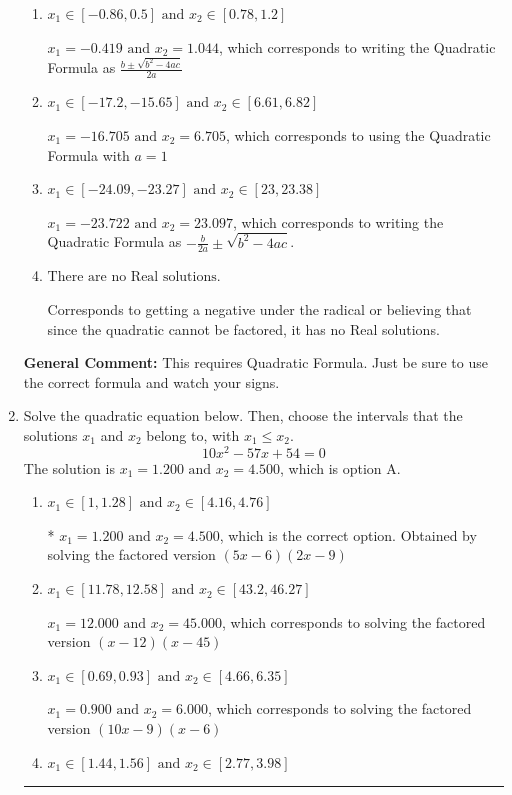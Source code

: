 \documentclass{extbook}[14pt]
\newcommand{\litem}[1]{\item #1

\rule{\textwidth}{0.4pt}}
\begin{document}
\begin{enumerate}
{\begin{enumerate}[label=\Alph*.]
* $x_1 = -1.044 \text{ and } x_2 = 0.419$, which is the correct option.
\item \( x_1 \in [-0.86, 0.5] \text{ and } x_2 \in [0.78, 1.2] \)

 $x_1 = -0.419 \text{ and } x_2 = 1.044$, which corresponds to writing the Quadratic Formula as $\frac{b \pm \sqrt{b^2 - 4ac}}{2a}$
\item \( x_1 \in [-17.2, -15.65] \text{ and } x_2 \in [6.61, 6.82] \)

 $x_1 = -16.705 \text{ and } x_2 = 6.705$, which corresponds to using the Quadratic Formula with $a=1$
\item \( x_1 \in [-24.09, -23.27] \text{ and } x_2 \in [23, 23.38] \)

 $x_1 = -23.722 \text{ and } x_2 = 23.097$, which corresponds to writing the Quadratic Formula as $-\frac{b}{2a} \pm \sqrt{b^2 - 4ac}$.
\item \( \text{There are no Real solutions.} \)

Corresponds to getting a negative under the radical or believing that since the quadratic cannot be factored, it has no Real solutions.
\end{enumerate}

\textbf{General Comment:} This requires Quadratic Formula. Just be sure to use the correct formula and watch your signs.
}
\litem{
Solve the quadratic equation below. Then, choose the intervals that the solutions $x_1$ and $x_2$ belong to, with $x_1 \leq x_2$.
\[ 10x^{2} -57 x + 54 = 0 \]The solution is \( x_1 = 1.200 \text{ and } x_2 = 4.500 \), which is option A.\begin{enumerate}[label=\Alph*.]
\item \( x_1 \in [1, 1.28] \text{ and } x_2 \in [4.16, 4.76] \)

* $x_1 = 1.200 \text{ and } x_2 = 4.500$, which is the correct option. Obtained by solving the factored version $(5x -6)(2x -9)$
\item \( x_1 \in [11.78, 12.58] \text{ and } x_2 \in [43.2, 46.27] \)

$x_1 = 12.000 \text{ and } x_2 = 45.000$, which corresponds to solving the factored version $(x -12)(x -45)$
\item \( x_1 \in [0.69, 0.93] \text{ and } x_2 \in [4.66, 6.35] \)

$x_1 = 0.900 \text{ and } x_2 = 6.000$, which corresponds to solving the factored version $(10x -9)(x -6)$
\item \( x_1 \in [1.44, 1.56] \text{ and } x_2 \in [2.77, 3.98] \)


\end{enumerate}}
\end{enumerate}
\end{document}
